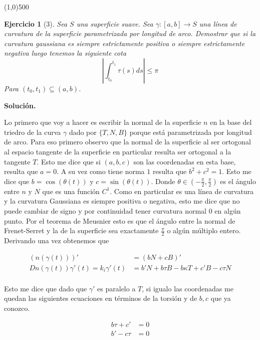 \documentclass{article}
\theoremstyle{plain} %
\newtheorem*{ej}{Ejercicio}
\theoremstyle{definition}
\begin{document}
	\line(1,0){500}
	
	\bigskip
	
	
	\begin{ej}[3]
		Sea $S$ una superficie suave. Sea $\gamma:[a,b] \to S$ una línea de curvatura de la superficie parametrizada por longitud de arco. Demostrar que si la curvatura gaussiana es siempre estrictamente positiva o siempre estrictamente negativa luego tenemos la siguiente cota
		\begin{equation*}
		|\int_{t_0}^{t_1} \tau(s) ds| \leq \pi
		\end{equation*} 
		Para $(t_0,t_1) \subseteq (a,b)$.
	\end{ej}

	\textbf{Solución.}
	
	Lo primero que voy a hacer es escribir la normal de la superficie $n$ en la base del triedro de la curva $\gamma$ dado por $\{T,N,B\}$ porque está parametrizada por longitud de arco. Para eso primero observo que la normal de la superficie al ser ortogonal al espacio tangente de la superficie en particular resulta ser ortogonal a la tangente $T$. Esto me dice que si $(a,b,c)$ son las coordenadas en esta base, resulta que $a=0$. A su vez como tiene norma $1$ resulta que $b^2 +c^2 = 1$. Esto me dice que $b=\cos(\theta(t))$ y $c=\sin(\theta(t))$. Donde $\theta \in (-\frac{\pi}{2},\frac{\pi}{2})$ es el ángulo entre $n$ y $N$ que es una función $C^1$. Como en particular es una línea de curvatura y la curvatura Gaussiana es siempre positiva o negativa, esto me dice que no puede cambiar de signo y por continuidad tener curvatura normal $0$ en algún punto. Por el teorema de Meusnier esto es que el ángulo entre la normal de Frenet-Serret y la de la superficie sea exactamente $\frac{\pi}{2}$ o algún múltiplo entero. 
	Derivando una vez obtenemos que
	
	\begin{align*}
	(n(\gamma(t)))' &= (bN + cB)' \\
	Dn(\gamma(t))\gamma'(t) = k_{i} \gamma' (t) &= b'N + b\tau B -b\kappa T  + c'B - c\tau N \\
	\end{align*}
	
	Esto me dice que dado que $\gamma'$ es paralelo a $T$, si igualo las coordenadas me quedan las siguientes ecuaciones en términos de la torsión y de $b,c$ que ya conozco.
	
	\begin{align*}
	b\tau +c'&=0\\
	b'- c\tau &=0
	\end{align*}
	
\end{document}
